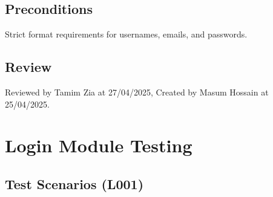 \documentclass{article}
\begin{document}
\subsection{Preconditions}
Strict format requirements for usernames, emails, and passwords.

\subsection{Review}
Reviewed by Tamim Zia at 27/04/2025, Created by Masum Hossain at 25/04/2025.

\section{Login Module Testing}

\subsection{Test Scenarios (L001)}
\end{document}
